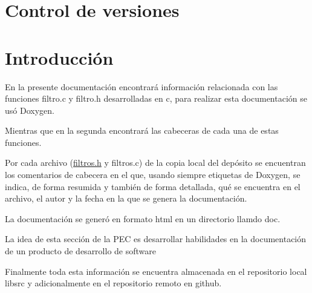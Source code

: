 \hypertarget{index_control}{}\section{Control de versiones}\label{index_control}
\hypertarget{index_intro_sec}{}\section{Introducción}\label{index_intro_sec}
En la presente documentación encontrará información relacionada con las funciones filtro.\+c y filtro.\+h desarrolladas en c, para realizar esta documentación se usó Doxygen.

Mientras que en la segunda encontrará las cabeceras de cada una de estas funciones.

Por cada archivo (\hyperlink{filtros_8h_source}{filtros.\+h} y filtros.\+c) de la copia local del depósito se encuentran los comentarios de cabecera en el que, usando siempre etiquetas de Doxygen, se indica, de forma resumida y también de forma detallada, qué se encuentra en el archivo, el autor y la fecha en la que se genera la documentación.

La documentación se generó en formato html en un directorio llamdo doc.

La idea de esta sección de la P\+E\+C es desarrollar habilidades en la documentación de un producto de desarrollo de software

Finalmente toda esta información se encuentra almacenada en el repositorio local libsrc y adicionalmente en el repositorio remoto en github. 
